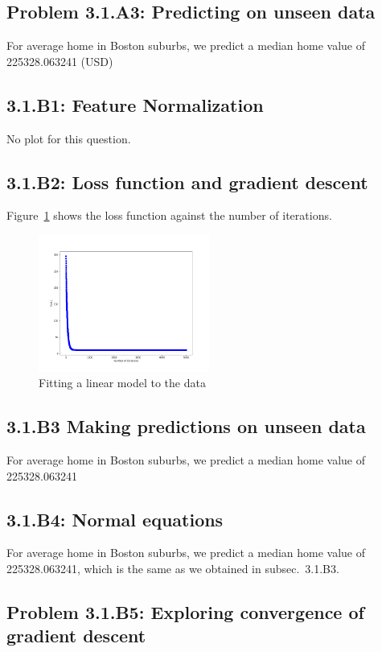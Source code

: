 \documentclass[english,11pt]{article}
\begin{document}
\subsection*{Problem 3.1.A3: Predicting on unseen data}
For average home in Boston suburbs, we predict a median home value of 225328.063241 (USD)

\subsection*{3.1.B1: Feature Normalization}
No plot for this question.

\subsection*{3.1.B2: Loss function and gradient descent}
Figure~\ref{fig:3_1_B2} shows the loss function against the number of iterations.
\begin{figure}[H]
\centering
\includegraphics[width=0.5\textwidth]{../hw1/part1/fig3_1_B_Muiti.png}
\caption{Fitting a linear model to the data}
\label{fig:3_1_B2}
\end{figure}

\subsection*{3.1.B3 Making predictions on unseen data\label{subsec:3_1_B3}}
For average home in Boston suburbs, we predict a median home value of 225328.063241

\subsection*{3.1.B4: Normal equations}
For average home in Boston suburbs, we predict a median home value of 225328.063241, which is the same as we obtained in subsec.~3.1.B3.


\subsection*{Problem 3.1.B5: Exploring convergence of gradient descent}
\end{document}
